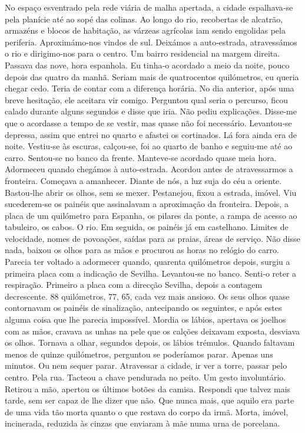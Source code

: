 No espaço esventrado pela rede viária de malha apertada, a cidade
espalhava­‑se pela planície até ao sopé das colinas. Ao longo do rio,
recobertas de alcatrão, armazéns e blocos de habitação, as várzeas
agrícolas iam sendo engolidas pela periferia. Aproximámo­‑nos vindos de
sul. Deixámos a auto­‑estrada, atravessámos o rio e dirigimo­‑nos para o
centro. Um bairro residencial na margem direita. Passava das nove, hora
espanhola. Eu tinha­‑o acordado a meio da noite, pouco depois das quatro
da manhã. Seriam mais de quatrocentos quilómetros, eu queria chegar
cedo. Teria de contar com a diferença horária. No dia anterior, após uma
breve hesitação, ele aceitara vir comigo. Perguntou qual seria o
percurso, ficou calado durante alguns segundos e disse que iria. Não
pediu explicações. Disse­‑me que o acordasse a tempo de se vestir, mas
quase não foi necessário. Levantou­‑se depressa, assim que entrei no
quarto e afastei os cortinados. Lá fora ainda era de noite. Vestiu­‑se
às escuras, calçou­‑se, foi ao quarto de banho e seguiu­‑me até ao
carro. Sentou­‑se no banco da frente. Manteve­‑se acordado quase meia
hora. Adormeceu quando chegámos à auto­‑estrada. Acordou antes de
atravessarmos a fronteira. Começava a amanhecer. Diante de nós, a luz
suja do céu a oriente. Bastou­‑lhe abrir os olhos, sem se mexer.
Pestanejou, fixou a estrada, imóvel. Viu sucederem­‑se os painéis que
assinalavam a aproximação da fronteira. Depois, a placa de um quilómetro
para Espanha, os pilares da ponte, a rampa de acesso ao tabuleiro, os
cabos. O rio. Em seguida, os painéis já em castelhano. Limites de
velocidade, nomes de povoações, saídas para as praias, áreas de serviço.
Não disse nada, baixou os olhos para as mãos e procurou as horas no
relógio do carro. Parecia ter voltado a adormecer quando, quarenta
quilómetros depois, surgiu a primeira placa com a indicação de Sevilha.
Levantou­‑se no banco. Senti­‑o reter a respiração. Primeiro a placa com
a direcção Sevilha, depois a contagem decrescente. 88 quilómetros, 77,
65, cada vez mais ansioso. Os seus olhos quase contornavam os painéis de
sinalização, antecipando os seguintes, e após estes alguma coisa que lhe
parecia impossível. Mordia os lábios, apertava os joelhos com as mãos,
cravava as unhas na pele que os calções deixavam exposta, desviava os
olhos. Tornava a olhar, segundos depois, os lábios trémulos. Quando
faltavam menos de quinze quilómetros, perguntou se poderíamos parar.
Apenas uns minutos. Ou nem sequer parar. Atravessar a cidade, ir ver a
torre, passar pelo centro. Pela rua. Tacteou a chave pendurada no peito.
Um gesto involuntário. Retirou a mão, apertou os últimos botões da
camisa. Respondi que talvez mais tarde, sem ser capaz de lhe dizer que
não. Que nunca mais, que aquilo era parte de uma vida tão morta quanto o
que restava do corpo da irmã. Morta, imóvel, incinerada, reduzida às
cinzas que enviaram à mãe numa urna de porcelana.

